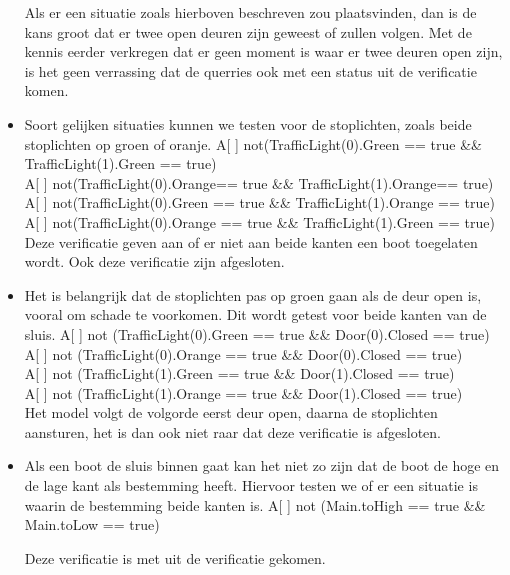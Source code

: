\documentclass{article}
\begin{document}
\begin{itemize}
Als er een situatie zoals hierboven beschreven zou plaatsvinden, dan is de kans groot dat er twee open deuren zijn geweest of zullen volgen. Met de kennis eerder verkregen dat er geen moment is waar er twee deuren open zijn, is het geen verrassing dat de querries ook met een {\color{green}{groene}} status uit de verificatie komen.
\vskip0.5cm

\item Soort gelijken situaties kunnen we testen voor de stoplichten, zoals beide stoplichten op groen of oranje.
{\center
A[ ] not(TrafficLight(0).Green == true \&\& TrafficLight(1).Green == true)\\
A[ ] not(TrafficLight(0).Orange== true \&\& TrafficLight(1).Orange== true)\\

A[ ] not(TrafficLight(0).Green == true \&\& TrafficLight(1).Orange == true)\\
A[ ] not(TrafficLight(0).Orange == true \&\& TrafficLight(1).Green == true)\\
}
\vskip0.3cm
Deze verificatie geven aan of er niet aan beide kanten een boot toegelaten wordt. Ook deze verificatie zijn {\color{green}{groen}} afgesloten.
\vskip0.5cm

\item Het is belangrijk dat de stoplichten pas op groen gaan als de deur open is, vooral om schade te voorkomen. Dit wordt getest voor beide kanten van de sluis.
{\center
A[ ] not (TrafficLight(0).Green == true \&\& Door(0).Closed == true)\\
A[ ] not (TrafficLight(0).Orange == true \&\& Door(0).Closed == true)\\
\vskip0.1cm
A[ ] not (TrafficLight(1).Green == true \&\& Door(1).Closed == true)\\
A[ ] not (TrafficLight(1).Orange == true \&\& Door(1).Closed == true)\\
}
Het model volgt de volgorde eerst deur open, daarna de stoplichten aansturen, het is dan ook niet raar dat deze verificatie {\color{green}{groen}} is afgesloten.
\vskip0.5cm

\item Als een boot de sluis binnen gaat kan het niet zo zijn dat de boot de hoge en de lage kant als bestemming heeft. Hiervoor testen we of er een situatie is waarin de bestemming beide kanten is.
{\center
A[ ] not (Main.toHigh == true \&\& Main.toLow == true)\\
}
\vskip0.3cm

Deze verificatie is met {\color{green}{groen}} uit de verificatie gekomen.
\vskip0.5cm


\end{itemize}
\end{document}
